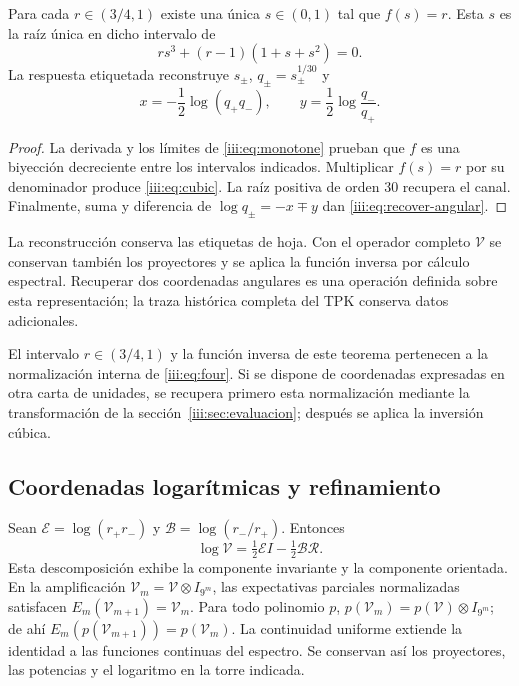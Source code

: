 \begin{theorem}
Para cada $r\in(3/4,1)$ existe una única $s\in(0,1)$ tal que $f(s)=r$.
Esta $s$ es la raíz única en dicho intervalo de
\begin{equation}
 r s^3+(r-1)(1+s+s^2)=0.
 \label{iii:eq:cubic}
\end{equation}
La respuesta etiquetada reconstruye $s_\pm$, $q_\pm=s_\pm^{1/30}$ y
\begin{equation}
 x=-\frac12\log(q_+q_-),\qquad
 y=\frac12\log\frac{q_-}{q_+}.
 \label{iii:eq:recover-angular}
\end{equation}
\end{theorem}
\begin{proof}
La derivada y los límites de \eqref{iii:eq:monotone} prueban que $f$ es una
biyección decreciente entre los intervalos indicados. Multiplicar $f(s)=r$
por su denominador produce \eqref{iii:eq:cubic}. La raíz positiva de orden
$30$ recupera el canal. Finalmente, suma y diferencia de
$\log q_\pm=-x\mp y$ dan \eqref{iii:eq:recover-angular}.
\end{proof}

La reconstrucción conserva las etiquetas de hoja. Con el operador completo
$\mathcal V$ se conservan también los proyectores y se aplica la función
inversa por cálculo espectral. Recuperar dos coordenadas angulares es una
operación definida sobre esta representación; la traza histórica completa
del TPK conserva datos adicionales.

El intervalo $r\in(3/4,1)$ y la función inversa de este teorema pertenecen
a la normalización interna de \eqref{iii:eq:four}. Si se dispone de
coordenadas expresadas en otra carta de unidades, se recupera primero
esta normalización mediante la transformación de la
sección~\ref{iii:sec:evaluacion}; después se aplica la inversión cúbica.

\subsection{Coordenadas logarítmicas y refinamiento}

Sean $\mathcal E=\log(r_+r_-)$ y $\mathcal B=\log(r_-/r_+)$. Entonces
\begin{equation}
 \log\mathcal V=\tfrac12\mathcal E I-\tfrac12\mathcal B\mathcal R.
 \label{iii:eq:logvac}
\end{equation}
Esta descomposición exhibe la componente invariante y la componente orientada.
En la amplificación $\mathcal V_m=\mathcal V\otimes I_{9^m}$, las
expectativas parciales normalizadas satisfacen
$E_m(\mathcal V_{m+1})=\mathcal V_m$. Para todo polinomio $p$,
$p(\mathcal V_m)=p(\mathcal V)\otimes I_{9^m}$; de ahí
$E_m(p(\mathcal V_{m+1}))=p(\mathcal V_m)$. La continuidad uniforme
extiende la identidad a las funciones continuas del espectro. Se conservan
así los proyectores, las potencias y el logaritmo en la torre indicada.

